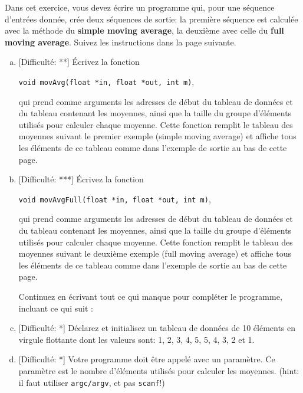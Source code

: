 \documentclass[11pt]{article}
\begin{document}
Dans cet exercice, vous devez écrire un programme qui, pour une séquence d'entrées donnée, crée deux séquences de sortie: la première séquence est calculée avec la méthode du \textbf{simple moving average}, la deuxième avec celle du \textbf{full moving average}.
Suivez les instructions dans la page suivante.

\newpage
\begin{enumerate}[a)]

\item \textcolor{mygreen}{[Difficulté: **]}
Écrivez la fonction 

\begin{center}
\texttt{void movAvg(float *in, float *out, int m)}, 
\end{center}

qui prend comme arguments les adresses de début du tableau de données et du tableau contenant les moyennes, ainsi que la taille du groupe d'éléments utilisés pour calculer chaque moyenne. Cette fonction remplit le tableau des moyennes suivant le premier exemple (simple moving average) et affiche tous les éléments de ce tableau comme dans l'exemple de sortie au bas de cette page.

\item \textcolor{mygreen}{[Difficulté: ***]}
Écrivez la fonction

\begin{center} 
\texttt{void movAvgFull(float *in, float *out, int m)}, 
\end{center}

qui prend comme arguments les adresses de début du tableau de données et du tableau contenant les moyennes, ainsi que la taille du groupe d'éléments utilisés pour calculer chaque moyenne. Cette fonction remplit le tableau des moyennes suivant le deuxième exemple (full moving average) et affiche tous les éléments de ce tableau comme dans l'exemple de sortie au bas de cette page.

\vspace{20pt}
\hspace{-20pt} Continuez en écrivant tout ce qui manque pour compléter le programme, incluant ce qui suit :
\vspace{20pt}

\item \textcolor{mygreen}{[Difficulté: *]} Déclarez et initialisez un tableau de données de 10 éléments en virgule flottante dont les valeurs sont: 1, 2, 3, 4, 5, 5, 4, 3, 2 et 1.

\item \textcolor{mygreen}{[Difficulté: *]}  Votre programme doit être appelé avec un paramètre. Ce paramètre est le nombre d'éléments utilisés pour calculer les moyennes. (hint: il faut utiliser \texttt{argc/argv}, et pas \texttt{scanf}!)
	\begin{itemize}


\end{itemize}
\end{enumerate}
\end{document}
